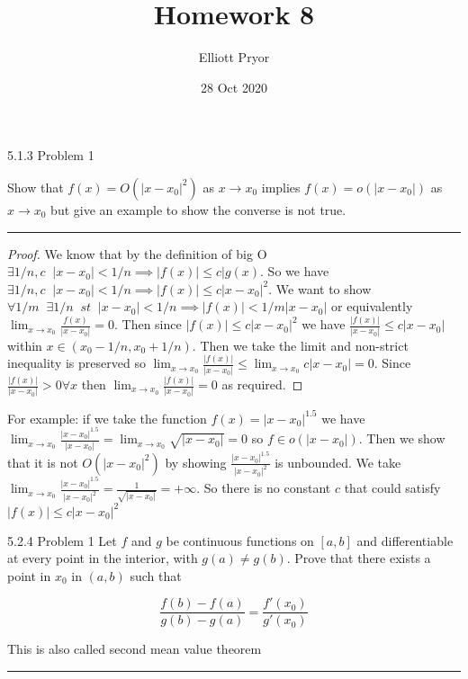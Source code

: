\documentclass[11pt]{article}
\title{Homework 8}
\author{Elliott Pryor}
\date{28 Oct 2020}
\renewcommand{\sp}{\; \;}
\begin{document}
\maketitle

 5.1.3 Problem 1

Show that $f(x) = O(|x - x_0|^2)$ as $x \to x_0$ implies $f(x) = o(|x - x_0|)$ as $x\to x_0$ but give an example to show the converse is not true.

\hrule

\begin{proof}

We know that by the definition of big O $\exists 1/n, c \sp |x - x_0| < 1/n \implies |f(x)| \leq c |g(x)$. So we have $\exists 1/n, c \sp |x - x_0| < 1/n \implies |f(x)| \leq c |x - x_0|^2$. 
We want to show $\forall 1/m \sp \exists 1/n \sp st \sp |x - x_0| < 1/n \implies |f(x)| < 1/m |x - x_0|$ or equivalently $\lim_{x \to x_0} \frac{f(x)}{|x - x_0|} = 0$. 
Then since $|f(x)| \leq c |x - x_0|^2$ we have $\frac{|f(x)|}{|x - x_0|} \leq c |x - x_0|$ within $x \in (x_0 - 1/n, x_0 + 1/n)$. Then we take the limit and non-strict inequality is preserved so $\lim_{x \to x_0} \frac{|f(x)|}{|x - x_0|} \leq \lim_{x \to x_0} c |x - x_0| = 0$. Since $\frac{|f(x)|}{|x - x_0|} > 0 \forall x$ then $\lim_{x \to x_0} \frac{|f(x)|}{|x - x_0|} = 0$ as required.
\end{proof}

For example: if we take the function $f(x) = |x - x_0|^{1.5}$ we have $\lim_{x \to x_0} \frac{|x - x_0|^{1.5}}{|x - x_0|} = \lim_{x \to x_0} \sqrt{|x - x_0|} = 0$ so $f \in o(|x - x_0|)$. 
Then we show that it is not $O(|x-x_0|^2)$ by showing $\frac{|x - x_0|^{1.5}}{|x - x_0|^{2}}$ is unbounded.
 We take $\lim_{x \to x_0} \frac{|x - x_0|^{1.5}}{|x - x_0|^{2}} = \frac{1}{\sqrt{|x-x_0|}} = + \infty$. So there is no constant $c$ that could satisfy $|f(x)| \leq c |x - x_0|^2$


 5.2.4 Problem 1
Let $f$ and $g$ be continuous functions on $[a,b]$ and differentiable at every point in the interior, with $g(a) \neq g(b)$. Prove that there exists a point in $x_0$ in $(a,b)$ such that

$$\frac{f(b) - f(a)}{g(b)-g(a)} = \frac{f'(x_0)}{g'(x_0)}$$

This is also called second mean value theorem

\hrule
\end{document}

